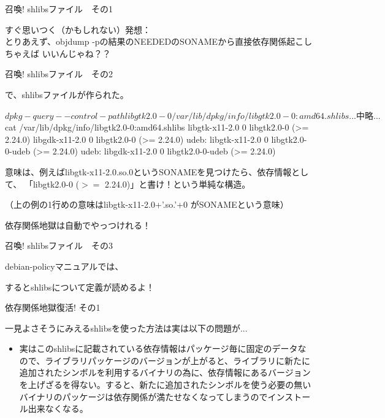 \begin{frame}{召喚! shlibsファイル　その1}

 すぐ思いつく（かもしれない）発想：\\
とりあえず、objdump -pの結果のNEEDEDのSONAMEから直接依存関係起こしちゃえば
いいんじゃね？？

\end{frame}

\begin{frame}[containsverbatim]{召喚! shlibsファイル　その2}

で、shlibsファイルが作られた。

\begin{commandline}
$ dpkg-query --control-path libgtk2.0-0
/var/lib/dpkg/info/libgtk2.0-0:amd64.shlibs
...中略...
$ cat /var/lib/dpkg/info/libgtk2.0-0:amd64.shlibs
libgtk-x11-2.0 0 libgtk2.0-0 (>= 2.24.0)
libgdk-x11-2.0 0 libgtk2.0-0 (>= 2.24.0)
udeb: libgtk-x11-2.0 0 libgtk2.0-0-udeb (>= 2.24.0)
udeb: libgdk-x11-2.0 0 libgtk2.0-0-udeb (>= 2.24.0)
\end{commandline}

意味は、例えばlibgtk-x11-2.0.so.0というSONAMEを見つけたら、依存情報として、
「libgtk2.0-0 ($>=$ 2.24.0)」と書け！という単純な構造。

（上の例の1行めの意味はlibgtk-x11-2.0+'.so.'+0 がSONAMEという意味）

\begin{center}
\Large
依存関係地獄は自動でやっつけれる！
\end{center}

\end{frame}

\begin{frame}[containsverbatim]{召喚! shlibsファイル　その3}

 debian-policyマニュアルでは、
するとshlibsについて定義が読めるよ！

\end{frame}

\begin{frame}{依存関係地獄復活! その1}

 一見よさそうにみえるshlibsを使った方法は実は以下の問題が...

\begin{itemize}
\item 実はこのshlibsに記載されている依存情報はパッケージ毎に固定のデータなので、ライブラリパッケージのバージョンが上がると、ライブラリに新たに追加されたシンボルを利用するバイナリの為に、依存情報にあるバージョンを上げざるを得ない。すると、新たに追加されたシンボルを使う必要の無いバイナリのパッケージは依存関係が満たせなくなってしまうのでインストール出来なくなる。
\end{itemize}

\end{frame}

